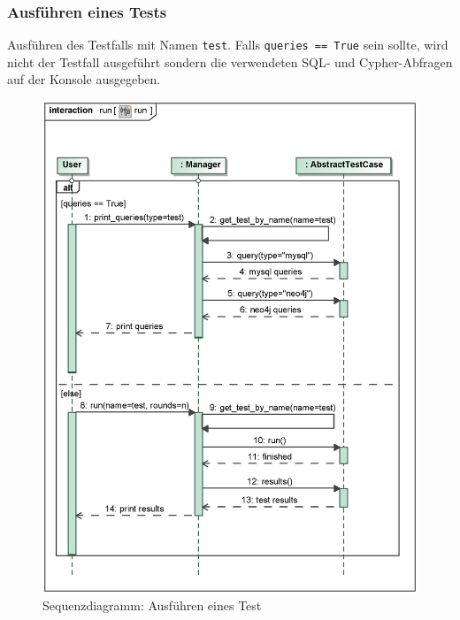 \subsubsection{Ausführen eines Tests}
Ausführen des Testfalls mit Namen \verb|test|. Falls \verb|queries == True| sein sollte, wird nicht der Testfall ausgeführt sondern die verwendeten SQL- und Cypher-Abfragen auf der Konsole ausgegeben.
\begin{figure}[H]
    \myfloatalign
    \includegraphics[width=\textwidth]{gfx/MtGDeepAnalysis/cli_run.eps}
    \caption{Sequenzdiagramm: Ausführen eines Test}
    \label{fig:seq:run}
\end{figure}

